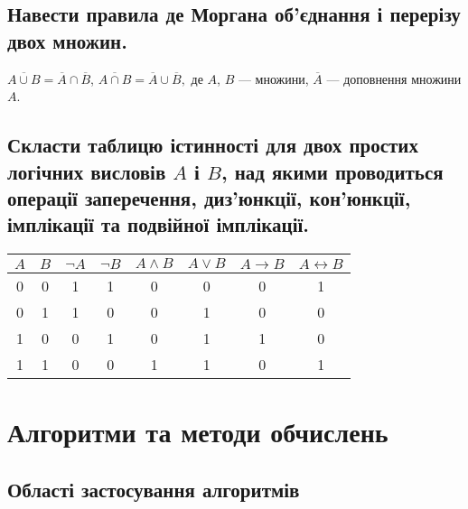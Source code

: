 \documentclass[a4paper,oneside,DIV=9,fontsize=12pt]{scrartcl}
\begin{document}
		\subsection{Навести правила де Моргана об’єднання і перерізу двох множин.}
			$\overline{A \cup B} = \overline{A} \cap \overline{B}$, $\overline{A \cap B} = \overline{A} \cup \overline{B},$ де $A$, $B$ --- множини, $\overline{A}$ --- доповнення множини $A$.
		
		\subsection{Скласти таблицю істинності для двох простих логічних висловів $A$ і $B$, над якими проводиться операції заперечення, диз'юнкції, кон'юнкції, імплікації та подвійної імплікації.}
			\begin{table}[h!]
				\centering
				
				\begin{tabular}{cccccccc}
					\toprule
					$A$ & $B$ & $\lnot A$ & $\lnot B$ & $A \land B$ & $A \lor B$ & $A \rightarrow B$ & $A \leftrightarrow B$ \\
					\midrule
					 0  & 0   & 1         & 1         & 0           & 0          & 0                 & 1\\
					 0  & 1   & 1         & 0         & 0           & 1          & 0                 & 0\\
					 1  & 0   & 0         & 1         & 0           & 1          & 1                 & 0\\
					 1  & 1   & 0         & 0         & 1           & 1          & 0                 & 1 \\	
					\bottomrule
				\end{tabular}
			\end{table}
		
	\section{Алгоритми та методи обчислень}
		\subsection{Області застосування алгоритмів}
		
\end{document}
